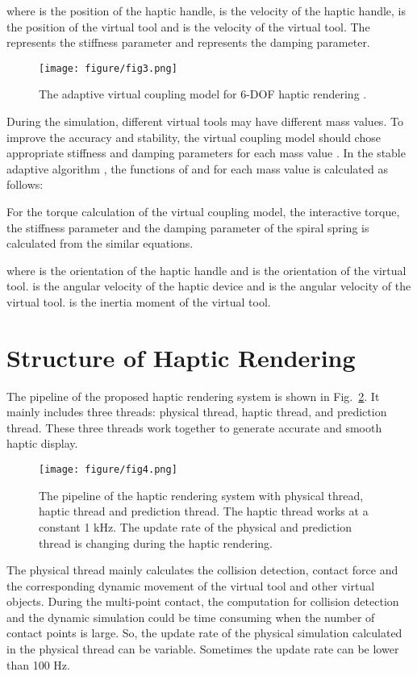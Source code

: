 \documentclass[10pt,journal,cspaper,compsoc]{IEEEtran}
\begin{document}
where  is the position of the haptic handle,  is the velocity of the haptic handle,  is the position of the virtual tool and  is the velocity of the virtual tool. The   represents the stiffness parameter and   represents the damping parameter. 
\begin{figure}[!t]
	\centering
	\texttt{[image: figure/fig3.png]}
	\caption{The adaptive virtual coupling model for 6-DOF haptic rendering \cite{no19}.}
	\label{fig:VC}
\end{figure}

During the simulation, different virtual tools may have different mass values. To improve the accuracy and stability, the virtual coupling model should chose appropriate stiffness and damping parameters for each mass value . In the stable adaptive algorithm \cite{no19}, the functions of  and  for each mass value is calculated as follows: 



For the torque calculation of the virtual coupling model, the interactive torque, the stiffness parameter   and the damping parameter  of the spiral spring is calculated from the similar equations.



where   is the orientation of the haptic handle and   is the orientation of the virtual tool.   is the angular velocity of the haptic device and  is the angular velocity of the virtual tool.  is the inertia moment  of the virtual tool.

\section{Structure of Haptic Rendering}
The pipeline of the proposed haptic rendering system is shown in Fig.~\ref{fig:renderpipeline}. It mainly includes three threads: physical thread, haptic thread, and prediction thread. These three threads work together to generate accurate and smooth haptic display.
\begin{figure}[!t]
	\centering
	\texttt{[image: figure/fig4.png]}
	\caption{The pipeline of the haptic rendering system with physical thread, haptic thread and prediction thread. The haptic thread works at a constant 1 kHz. The update rate of the physical and prediction thread is changing during the haptic rendering.}
	\label{fig:renderpipeline}
\end{figure}
The physical thread mainly calculates the collision detection, contact force and the corresponding dynamic movement of the virtual tool and other virtual objects. During the multi-point contact, the computation for collision detection and the dynamic simulation could be time consuming when the number of contact points is large. So, the update rate of the physical simulation calculated in the physical thread can be variable. Sometimes the update rate can be lower than 100 Hz.
\end{document}
